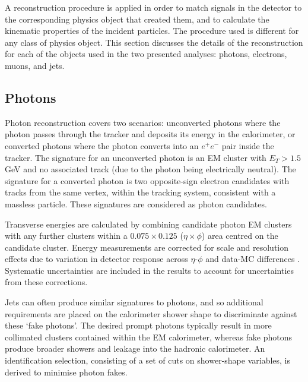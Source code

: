 
A reconstruction procedure is applied in order to match signals in the detector
to the corresponding physics object that created them, and to calculate the
kinematic properties of the incident particles.
The procedure used is different for any class of physics object. This section
discusses the details of the reconstruction for each of the objects used in the
two presented analyses: photons, electrons, muons, and jets.


\subsection{Photons}
\label{sec:methods-reconsruction-photon}

Photon reconstruction covers two scenarios: unconverted photons where the photon
passes through the tracker and deposits its energy in the calorimeter, or
converted photons where the photon converts into an $e^+e^-$ pair inside the
tracker.
The signature for an unconverted photon is an \ac{EM} cluster with $E_T > 1.5$
GeV and no associated
track (due to the photon being electrically neutral). The signature for a
converted photon is two opposite-sign electron candidates with tracks from the
same vertex, within the tracking system, consistent with a massless particle.
These signatures are considered as photon candidates.

Transverse energies are calculated by combining candidate photon \ac{EM}
clusters with any further clusters within a $0.075\times0.125$
($\eta\times\phi$) area centred on the candidate cluster. Energy measurements
are corrected for scale and resolution effects due to variation in detector
response across $\eta$-$\phi$ and data-\ac{MC} differences
\cite{EGamCalibration2019}. Systematic uncertainties are included in the results
to account for uncertainties from these corrections.

Jets can often produce similar signatures to photons, and so additional
requirements are placed on the calorimeter shower shape to discriminate against
these `fake photons'. The desired prompt photons typically result in more
collimated clusters contained within the \ac{EM} calorimeter, whereas fake
photons produce broader showers and leakage into the hadronic calorimeter.
An identification selection, consisting of a set of cuts on shower-shape
variables, is derived to minimise photon fakes.

